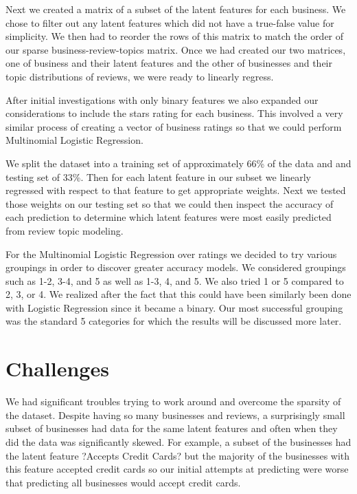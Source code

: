 \documentclass{article}
\begin{document}
Next we created a matrix of a subset of the latent features for each business.  We chose to filter out any latent features which did not have a true-false value for simplicity.  We then had to reorder the rows of this matrix to match the order of our sparse business-review-topics matrix.  Once we had created our two matrices, one of business and their latent features and the other of businesses and their topic distributions of reviews, we were ready to linearly regress.

After initial investigations with only binary features we also expanded our considerations to include the stars rating for each business.  This involved a very similar process of creating a vector of business ratings so that we could perform Multinomial Logistic Regression.


We split the dataset into a training set of approximately 66\% of the data and and testing set of 33\%.  Then for each latent feature in our subset we linearly regressed with respect to that feature to get appropriate weights.  Next we tested those weights on our testing set so that we could then inspect the accuracy of each prediction to determine which latent features were most easily predicted from review topic modeling. 

For the Multinomial Logistic Regression over ratings we decided to try various groupings in order to discover greater accuracy models.  We considered groupings such as 1-2, 3-4, and 5 as well as 1-3, 4, and 5.  We also tried 1 or 5 compared to 2, 3, or 4.  We realized after the fact that this could have been similarly been done with Logistic Regression since it became a binary.  Our most successful grouping was the standard 5 categories for which the results will be discussed more later.

\section{Challenges}

We had significant troubles trying to work around and overcome the sparsity of the dataset.  Despite having so many businesses and reviews, a surprisingly small subset of businesses had data for the same latent features and often when they did the data was significantly skewed.  For example, a subset of the businesses had the latent feature ?Accepts Credit Cards? but the majority of the businesses with this feature accepted credit cards so our initial attempts at predicting were worse that predicting all businesses would accept credit cards.
\end{document}
